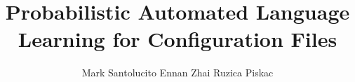 \documentclass{llncs}
\begin{document}
\setlength{\pdfpageheight}{\paperheight}
\setlength{\pdfpagewidth}{\paperwidth}





\title{Probabilistic Automated Language Learning for Configuration Files}

\author{Mark Santolucito \quad Ennan Zhai \quad  Ruzica Piskac}

\maketitle







\nocite{*}

\begin{tiny}


\end{tiny}
\end{document}
